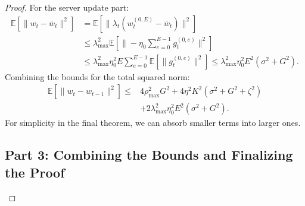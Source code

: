 \documentclass[11pt]{article}
\begin{document}
\begin{proof}
For the server update part:
\begin{align}
    \mathbb{E}[\|w_t - \bar{w}_t\|^2] &= \mathbb{E}[\|\lambda_t(w_t^{(0,E)} - \bar{w}_t)\|^2] \nonumber \\
    &\le \lambda_{\max}^2 \mathbb{E}[\|-\eta_0 \sum_{e=0}^{E-1} g_t^{(0,e)}\|^2] \nonumber \\
    &\le \lambda_{\max}^2 \eta_0^2 E \sum_{e=0}^{E-1} \mathbb{E}[\|g_t^{(0,e)}\|^2] \le \lambda_{\max}^2 \eta_0^2 E^2 (\sigma^2 + G^2).
\end{align}
Combining the bounds for the total squared norm:
\begin{align}
    \mathbb{E}[\|w_t - w_{t-1}\|^2] \le & 4\rho_{\max}^2 G^2 + 4\eta^2 K^2 (\sigma^2 + G^2 + \zeta^2) \nonumber \\
    & + 2\lambda_{\max}^2 \eta_0^2 E^2 (\sigma^2 + G^2). \label{eq:bound_sq_norm_supp}
\end{align}
For simplicity in the final theorem, we can absorb smaller terms into larger ones.

\subsection{Part 3: Combining the Bounds and Finalizing the Proof}


\end{proof}
\end{document}
